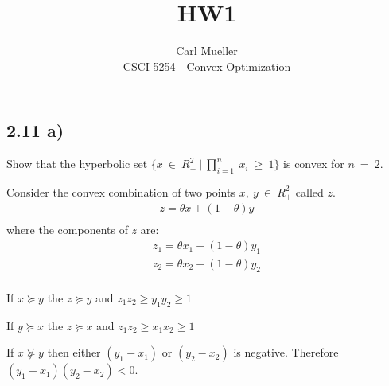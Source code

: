 \documentclass[12pt]{article}
\newenvironment{proposition}[2][Proposition]{\begin{trivlist}
\item[\hskip \labelsep {\bfseries #1}\hskip \labelsep {\bfseries #2.}]}{\end{trivlist}}
\begin{document}
 
 
 
\title{HW1}%
\author{Carl Mueller\\ %
CSCI 5254 - Convex Optimization} %
 
\maketitle

\subsection*{2.11 a)}
Show that the hyperbolic set $\{x\ \in\ R^2_+\ |\ \prod^{n}_{i=1}\ x_i\ \ge\ 1\}$ is convex for $n\ = \ 2$.
 
\begin{proposition}{1}
Consider the convex combination of two points $x,\ y\ \in\ R^2_+$ called $z$.\\
\begin{align*}
z=\theta x + (1-\theta) y\\
\end{align*}
where the components of $z$ are:\\
\begin{align*}
z_1=\theta x_1 + (1-\theta) y_1\\
z_2=\theta x_2 + (1-\theta) y_2\\
\end{align*}
\end{proposition}

\begin{proposition}{2}
If $x \succeq y$ the $z \succeq y$ and $ z_1z_2 \ge y_1y_2 \ge 1$
\end{proposition}

\begin{proposition}{3}
If $y \succeq x$ the $z \succeq x$ and $ z_1z_2 \ge x_1x_2 \ge 1$
\end{proposition}

\begin{proposition}{4}
If $x \not\succeq y$ then either $(y_1 - x_1)$ or $(y_2 - x_2)$ is negative.
Therefore $(y_1 - x_1)(y_2 - x_2) < 0$.
\end{proposition}
\end{document}
